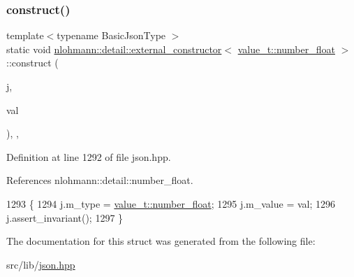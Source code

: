\subsubsection{\texorpdfstring{construct()}{construct()}}
{\footnotesize\ttfamily template$<$typename Basic\+Json\+Type $>$ \\
static void \hyperlink{structnlohmann_1_1detail_1_1external__constructor}{nlohmann\+::detail\+::external\+\_\+constructor}$<$ \hyperlink{namespacenlohmann_1_1detail_a1ed8fc6239da25abcaf681d30ace4985ad9966ecb59667235a57b4b999a649eef}{value\+\_\+t\+::number\+\_\+float} $>$\+::construct (\begin{DoxyParamCaption}\item[{Basic\+Json\+Type \&}]{j,  }\item[{typename Basic\+Json\+Type\+::number\+\_\+float\+\_\+t}]{val }\end{DoxyParamCaption})\hspace{0.3cm}{\ttfamily [inline]}, {\ttfamily [static]}, {\ttfamily [noexcept]}}



Definition at line 1292 of file json.\+hpp.



References nlohmann\+::detail\+::number\+\_\+float.


\begin{DoxyCode}
1293     \{
1294         j.m\_type = \hyperlink{namespacenlohmann_1_1detail_a1ed8fc6239da25abcaf681d30ace4985ad9966ecb59667235a57b4b999a649eef}{value\_t::number\_float};
1295         j.m\_value = val;
1296         j.assert\_invariant();
1297     \}
\end{DoxyCode}


The documentation for this struct was generated from the following file\+:\begin{DoxyCompactItemize}
\item 
src/lib/\hyperlink{json_8hpp}{json.\+hpp}\end{DoxyCompactItemize}
